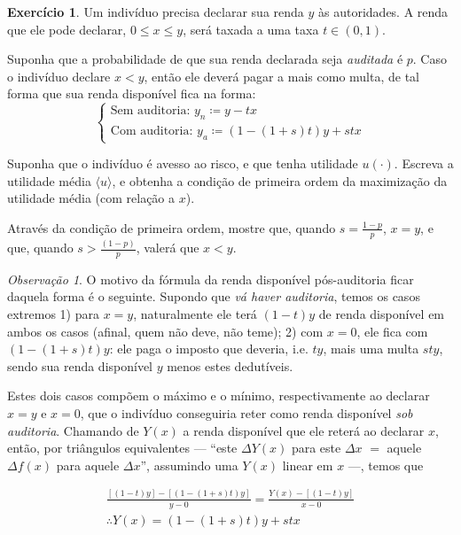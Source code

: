 \documentclass[12pt]{article}
\numberwithin{equation}{section}
\theoremstyle{plain}
\theoremstyle{definition}
\newtheorem{exercise}{Exercício}
\theoremstyle{remark}
\newtheorem*{remark}{Observação}
\begin{document}
\begin{exercise}
\parencite[, pp. 223-4]{Cowell2004} Um indivíduo precisa declarar sua
renda \(y\) às autoridades. A renda que ele pode declarar,
\(0 \leq x \leq y\), será taxada a uma taxa \(t \in (0,1)\).

Suponha que a probabilidade de que sua renda declarada seja
\textit{auditada} é \(p\). Caso o indivíduo declare \(x < y\), então ele
deverá pagar a mais como multa, de tal forma que sua renda disponível
fica na forma:
\[
\begin{cases}
\text{Sem auditoria: } y_n \coloneqq y - tx \\
\text{Com auditoria: } y_a \coloneqq (1-(1+s)t)y + stx 
\end{cases}
\]

Suponha que o indivíduo é avesso ao risco, e que tenha utilidade \(u(\cdot)\). Escreva a utilidade média \(\langle u \rangle\), e obtenha a condição de primeira ordem da maximização da utilidade média (com relação a \(x\)).

Através da condição de primeira ordem, mostre que, quando \(s=\frac{1-p}{p}\), \(x=y\), e que, quando \(s>\frac{(1-p)}{p}\), valerá que \(x < y\).

\begin{remark}  
O motivo da fórmula da renda disponível pós-auditoria ficar daquela forma é o seguinte.
Supondo que \textit{vá haver auditoria}, temos os casos extremos 1) para
\(x=y\), naturalmente ele terá \((1-t)y\) de renda disponível em ambos
os casos (afinal, quem não deve, não teme); 2) com \(x=0\), ele fica com
\((1 - (1+s)t)y\): ele paga o imposto que deveria, i.e. $ty$, mais uma multa $sty$, sendo sua renda disponível $y$ menos estes dedutíveis. 

Estes dois casos compõem o máximo e o mínimo, respectivamente ao declarar $x=y$ e $x=0$, que o indivíduo conseguiria reter como renda disponível \textit{sob auditoria}. Chamando de $Y(x)$ a renda disponível que ele reterá ao declarar $x$, então, por triângulos equivalentes --- ``este $\Delta Y(x)$ para este $\Delta x$ $=$ aquele $\Delta f(x)$ para aquele $\Delta x$'', assumindo uma $Y(x)$ linear em $x$ ---, temos que

\begin{align*}
\frac{[(1-t)y] - [(1-(1+s)t)y]}{y - 0} = \frac{Y(x) - [(1-t)y]}{x - 0} \\
\therefore Y(x) = (1-(1+s)t)y + stx
\end{align*}
\end{remark}
\end{exercise}
\end{document}

